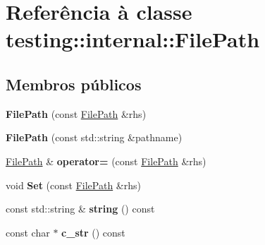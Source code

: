\hypertarget{classtesting_1_1internal_1_1FilePath}{\section{Referência à classe testing\-:\-:internal\-:\-:File\-Path}
\label{classtesting_1_1internal_1_1FilePath}
}
\subsection*{Membros públicos}
\begin{DoxyCompactItemize}
\item 
\hypertarget{classtesting_1_1internal_1_1FilePath_ae9efd0fee56c6e3e2d659b464250b112}{{\bfseries File\-Path} (const \hyperlink{classtesting_1_1internal_1_1FilePath}{File\-Path} \&rhs)}\label{classtesting_1_1internal_1_1FilePath_ae9efd0fee56c6e3e2d659b464250b112}

\item 
\hypertarget{classtesting_1_1internal_1_1FilePath_a9fc072b140aa0652a7022fb809fe3abe}{{\bfseries File\-Path} (const std\-::string \&pathname)}\label{classtesting_1_1internal_1_1FilePath_a9fc072b140aa0652a7022fb809fe3abe}

\item 
\hypertarget{classtesting_1_1internal_1_1FilePath_a8d9c1bafb90f10bcd5611a54d8f326ef}{\hyperlink{classtesting_1_1internal_1_1FilePath}{File\-Path} \& {\bfseries operator=} (const \hyperlink{classtesting_1_1internal_1_1FilePath}{File\-Path} \&rhs)}\label{classtesting_1_1internal_1_1FilePath_a8d9c1bafb90f10bcd5611a54d8f326ef}

\item 
\hypertarget{classtesting_1_1internal_1_1FilePath_a15a42de7518e89254e0640dd9317d5f7}{void {\bfseries Set} (const \hyperlink{classtesting_1_1internal_1_1FilePath}{File\-Path} \&rhs)}\label{classtesting_1_1internal_1_1FilePath_a15a42de7518e89254e0640dd9317d5f7}

\item 
\hypertarget{classtesting_1_1internal_1_1FilePath_a7c544a30af67e2da5ce7e625f8402818}{const std\-::string \& {\bfseries string} () const }\label{classtesting_1_1internal_1_1FilePath_a7c544a30af67e2da5ce7e625f8402818}

\item 
\hypertarget{classtesting_1_1internal_1_1FilePath_a85297234dac0acd936632dff8634c2b9}{const char $\ast$ {\bfseries c\-\_\-str} () const }\label{classtesting_1_1internal_1_1FilePath_a85297234dac0acd936632dff8634c2b9}


\end{DoxyCompactItemize}
